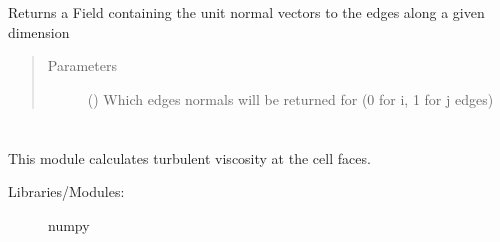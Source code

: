 \documentclass[letterpaper,10pt,english]{sphinxmanual}
\begin{document}
\begin{fulllineitems}
\begin{fulllineitems}
\begin{quote}
\begin{description}
\end{description}\end{quote}

\end{fulllineitems}


\begin{fulllineitems}
\label{\detokenize{autoapi/Workspace/index:Workspace.Workspace.edge_normals}}
\sphinxAtStartPar
Returns a Field containing the unit normal vectors to the edges along a given dimension
\begin{quote}\begin{description}
\item[{Parameters}] \leavevmode
\sphinxAtStartPar
{} () \textendash{} Which edges normals will be returned for (0 for i, 1 for j edges)

\end{description}\end{quote}

\end{fulllineitems}


\end{fulllineitems}



\section{}
\label{\detokenize{autoapi/BaldwinLomax/index:module-BaldwinLomax}}\label{\detokenize{autoapi/BaldwinLomax/index:baldwinlomax}}\label{\detokenize{autoapi/BaldwinLomax/index::doc}}
\sphinxAtStartPar
This module calculates turbulent viscosity at the cell faces.
\begin{description}
\item[{Libraries/Modules:}] \leavevmode
\sphinxAtStartPar
numpy

\end{description}
\end{document}
